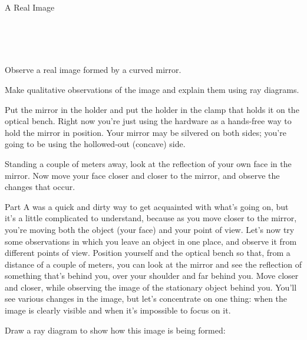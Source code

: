 \begin{lab}{A Real Image}\label{lab:real-image}

\apparatus
{}\\
\\
\\

\begin{goals}

\item[] Observe a real image formed by a curved mirror.

\item[] Make qualitative observations of the image and explain them using ray diagrams.

\end{goals}


Put the mirror in the holder and put the holder in the clamp that holds it on the optical
bench. Right now you're just using the hardware as a hands-free way to hold the mirror in
position. Your mirror may be silvered on both sides; you're going to be using the hollowed-out
(concave) side.

Standing a couple of meters away, look at the reflection of your own face in the
mirror. Now move your face closer and closer to the mirror, and observe the changes that
occur. 


Part A was a quick and dirty way to get acquainted with what's going on, but it's a little
complicated to understand, because as you move closer to the mirror, you're moving both
the object (your face) and your point of view. Let's now try some observations in which
you leave an object in one place, and observe it from different points of view.
Position yourself and the optical bench so that, from a distance of a couple of meters,
you can look at the mirror and see the reflection of something that's behind you, over
your shoulder and far behind you. Move closer and closer, while observing the image
of the stationary object behind you. 
You'll see various changes in the image, but let's concentrate on one thing: when the
image is clearly visible and when it's impossible to focus on it.

\pagebreak[4]

Draw a ray diagram to show how this image is being formed:

\newcommand{\labspaceforraydiagram}{\vspace{30mm}}
\labspaceforraydiagram


\end{lab}
